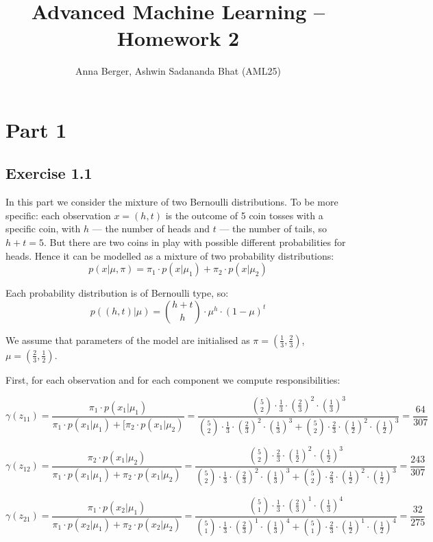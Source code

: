 \documentclass[11pt,a4paper]{article}
\title{\textbf{Advanced Machine Learning -- Homework 2}}
\author{Anna Berger, Ashwin Sadananda Bhat (AML25)}
\begin{document}
	\maketitle
	
	\section*{Part 1}
	\subsection*{Exercise 1.1}
	
	In this part we consider the mixture of two Bernoulli distributions. To be more specific: each observation $x=(h, t)$ is the outcome of 5 coin tosses with a specific coin, with $h$ --- the number of heads and $t$ --- the number of tails, so $h+t=5$. But there are two coins in play with possible different probabilities for heads. Hence it can be modelled as a mixture of two probability distributions:
	$$ p(x | \mu,\pi) = \pi_1 \cdot p(x|\mu_1) + \pi_2 \cdot p(x|\mu_2) $$
	
	Each probability distribution is of Bernoulli type, so:
	$$ p((h,t)|\mu) = \binom {h+t}{h} \cdot \mu^h \cdot (1-\mu)^t$$
	
	We assume that parameters of the model are initialised as $\pi = \left(
	 \frac{1}{3}, \frac{2}{3}\right)$, $\mu = \left(
	 \frac{2}{3}, \frac{1}{2}\right)$.
	
	First, for each observation and for each component we compute responsibilities:
	
	$$ \gamma(z_{11}) = \frac{\pi_1 \cdot p(x_1|\mu_1)}{\pi_1 \cdot p(x_1|\mu_1)+[\pi_2 \cdot p(x_1|\mu_2)} = \frac{\binom {5}{2} \cdot \frac{1}{3} \cdot (\frac{2}{3})^2 \cdot (\frac{1}{3})^3}{\binom {5}{2} \cdot \frac{1}{3} \cdot (\frac{2}{3})^2 \cdot (\frac{1}{3})^3+\binom {5}{2} \cdot \frac{2}{3} \cdot (\frac{1}{2})^2 \cdot (\frac{1}{2})^3}=\frac{64}{307} $$
	
	$$ \gamma(z_{12}) = \frac{\pi_2 \cdot p(x_1|\mu_2)}{\pi_1 \cdot p(x_1|\mu_1)+\pi_2 \cdot p(x_1|\mu_2)} = \frac{\binom {5}{2} \cdot \frac{2}{3} \cdot (\frac{1}{2})^2 \cdot (\frac{1}{2})^3}{\binom {5}{2} \cdot \frac{1}{3} \cdot (\frac{2}{3})^2 \cdot (\frac{1}{3})^3+\binom {5}{2} \cdot \frac{2}{3} \cdot (\frac{1}{2})^2 \cdot (\frac{1}{2})^3}=\frac{243}{307} $$
	
	$$ \gamma(z_{21}) = \frac{\pi_1 \cdot p(x_2|\mu_1)}{\pi_1 \cdot p(x_2|\mu_1)+\pi_2 \cdot p(x_2|\mu_2)} = \frac{\binom {5}{1} \cdot \frac{1}{3} \cdot (\frac{2}{3})^1 \cdot (\frac{1}{3})^4}{\binom {5}{1} \cdot \frac{1}{3} \cdot (\frac{2}{3})^1 \cdot (\frac{1}{3})^4+\binom {5}{1} \cdot \frac{2}{3} \cdot (\frac{1}{2})^1 \cdot (\frac{1}{2})^4}=\frac{32}{275} $$
	
\end{document}
